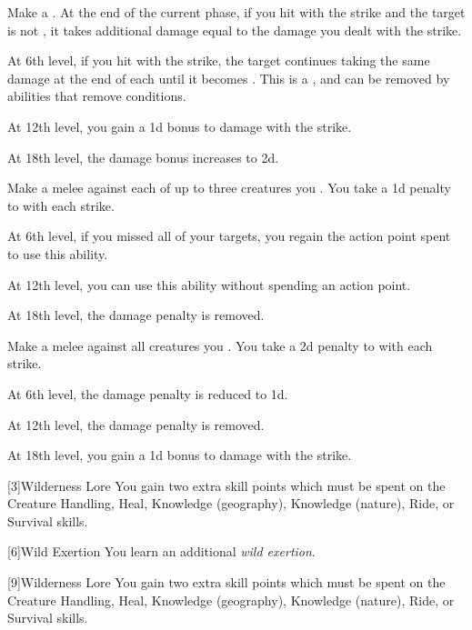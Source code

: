 {             Make a .
            At the end of the current phase, if you hit with the strike and the target is not , it takes additional damage equal to the damage you dealt with the strike.
            \par At 6th level, if you hit with the strike, the target continues taking the same damage at the end of each  until it becomes .
            This is a , and can be removed by abilities that remove conditions.
            \par At 12th level, you gain a \plus1d bonus to damage with the strike.
            \par At 18th level, the damage bonus increases to \plus2d.

             Make a melee  against each of up to three creatures you .
            You take a \minus1d penalty to  with each strike.
            \par At 6th level, if you missed all of your targets, you regain the action point spent to use this ability.
            \par At 12th level, you can use this ability without spending an action point.
            \par At 18th level, the damage penalty is removed.

             Make a melee  against all creatures you .
            You take a \minus2d penalty to  with each strike.
            \par At 6th level, the damage penalty is reduced to \minus1d.
            \par At 12th level, the damage penalty is removed.
            \par At 18th level, you gain a \plus1d bonus to damage with the strike.
        }

        [3]{Wilderness Lore} You gain two extra skill points which must be spent on the Creature Handling, Heal, Knowledge (geography), Knowledge (nature), Ride, or Survival skills.

        [6]{Wild Exertion}
        You learn an additional \textit{wild exertion}.

        [9]{Wilderness Lore} You gain two extra skill points which must be spent on the Creature Handling, Heal, Knowledge (geography), Knowledge (nature), Ride, or Survival skills.


